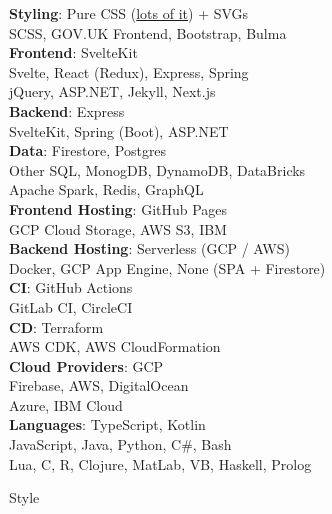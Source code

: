\documentclass[hidelinks, 12pt, a4paper]{article}
\begin{document}
	\begin{multicols}{2}
		\textbf{Styling}: Pure CSS (\href{https://stevenwaterman.uk/you-dont-need-js/}{lots of it}) + SVGs\\
		SCSS, GOV.UK Frontend, Bootstrap, Bulma\\
		
		\textbf{Frontend}: SvelteKit\\
		Svelte, React (Redux), Express, Spring\\
		jQuery, ASP.NET, Jekyll, Next.js\\
		
		\textbf{Backend}: Express\\
		SvelteKit, Spring (Boot), ASP.NET\\
		
		\textbf{Data}: Firestore, Postgres\\
		Other SQL, MonogDB, DynamoDB, DataBricks\\
		Apache Spark, Redis, GraphQL\\
		
		\textbf{Frontend Hosting}: GitHub Pages\\
		GCP Cloud Storage, AWS S3, IBM\\
		
		\textbf{Backend Hosting}: Serverless (GCP / AWS)\\
		Docker, GCP App Engine, None (SPA + Firestore)\\
		
		\textbf{CI}: GitHub Actions\\
		GitLab CI, CircleCI\\
		
		\textbf{CD}: Terraform\\
		AWS CDK, AWS CloudFormation\\
		
		\textbf{Cloud Providers}: GCP\\
		Firebase, AWS, DigitalOcean\\
		Azure, IBM Cloud\\
		
		\textbf{Languages}: TypeScript, Kotlin\\
		JavaScript, Java, Python, C\#, Bash\\
		Lua, C, R, Clojure, MatLab, VB, Haskell, Prolog\\
	\end{multicols}

	\vspace{40pt}
	\begin{Large}Style\end{Large}\\
	
\end{document}
